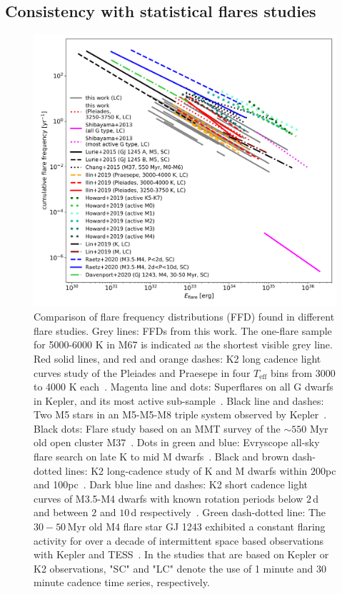 \documentclass{aa}
\begin{document}
\subsection{Consistency with statistical flares studies}
\label{sec:consistency_other_work}
\begin{figure}[ht!]
    \centering
    \includegraphics[width=13.5cm]{pics/FFDs/discussion_FFDs.png}
    \caption{Comparison of flare frequency distributions (FFD) found in different flare studies. Grey lines: FFDs from this work. The one-flare sample for 5000-6000 K in M67 is indicated as the shortest visible grey line. Red solid lines, and red and orange dashes: K2 long cadence light curves study of the Pleiades and Praesepe in four $T_\mathrm{eff}$ bins from 3000 to 4000 K each~. Magenta line and dots: Superflares on all G dwarfs in Kepler, and its most active sub-sample~\citep{shibayama2013}. Black line and dashes: Two M5 stars in an M5-M5-M8 triple system observed by Kepler~\citep{lurie2015}. Black dots: Flare study based on an MMT survey of the $\sim550$ Myr old open cluster M37~\citep{chang2015}. Dots in green and blue: Evryscope all-sky flare search on late K to mid M dwarfs~\citep{howard2019}. Black and brown dash-dotted lines: K2 long-cadence study of K and M dwarfs within 200pc and 100pc~\citep{lin2019}. Dark blue line and dashes: K2 short cadence light curves of M3.5-M4 dwarfs with known rotation periods below $2\,$d and between $2$ and $10\,$d respectively~\citep{raetz2020}. Green dash-dotted line: The $30-50$\,Myr old M4 flare star GJ 1243 exhibited a constant flaring activity for over a decade of intermittent space based observations with Kepler and TESS~\citep{davenport2020arxiv}. In the studies that are based on Kepler or K2 observations, "SC" and "LC" denote the use of 1 minute and 30 minute cadence time series, respectively.}      
    \label{fig:otherwork}
\end{figure}
\end{document}
